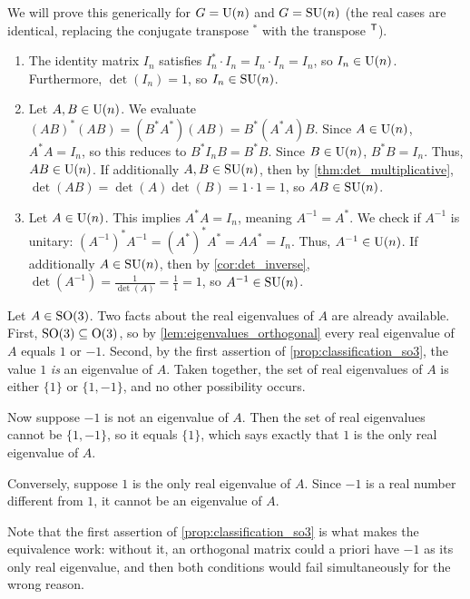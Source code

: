 \begin{exercisesolution}
\label{sol:group_properties}
We will prove this generically for $G = \operatorname{U}(n)$ and $G = \operatorname{SU}(n)$ (the real cases are identical, replacing the conjugate transpose $^*$ with the transpose $^{\mathsf{T}}$).
\begin{enumerate}[label=\textbf{(\alph*)}]
    \item The identity matrix $I_n$ satisfies $I_n^* \cdot I_n = I_n \cdot I_n = I_n$, so $I_n \in \operatorname{U}(n)$. Furthermore, $\det(I_n) = 1$, so $I_n \in \operatorname{SU}(n)$.
    
    \item Let $A, B \in \operatorname{U}(n)$. We evaluate $(AB)^* (AB) = (B^* A^*) (AB) = B^* (A^* A) B$. Since $A \in \operatorname{U}(n)$, $A^* A = I_n$, so this reduces to $B^* I_n B = B^* B$. Since $B \in \operatorname{U}(n)$, $B^* B = I_n$. Thus, $AB \in \operatorname{U}(n)$. 
    If additionally $A, B \in \operatorname{SU}(n)$, then by \cref{thm:det_multiplicative}, $\det(AB) = \det(A)\det(B) = 1 \cdot 1 = 1$, so $AB \in \operatorname{SU}(n)$.
    
    \item Let $A \in \operatorname{U}(n)$. This implies $A^* A = I_n$, meaning $A^{-1} = A^*$. We check if $A^{-1}$ is unitary: $(A^{-1})^* A^{-1} = (A^*)^* A^* = A A^* = I_n$. Thus, $A^{-1} \in \operatorname{U}(n)$. 
    If additionally $A \in \operatorname{SU}(n)$, then by \cref{cor:det_inverse}, $\det(A^{-1}) = \frac{1}{\det(A)} = \frac{1}{1} = 1$, so $A^{-1} \in \operatorname{SU}(n)$.
\end{enumerate}
\end{exercisesolution}

\begin{exercisesolution}
\label{sol:why_only_real_eigenvalue}
Let $A \in \operatorname{SO}(3)$. Two facts about the real eigenvalues of $A$ are already available. First, $\operatorname{SO}(3) \subseteq \operatorname{O}(3)$, so by \cref{lem:eigenvalues_orthogonal} every real eigenvalue of $A$ equals $1$ or $-1$. Second, by the first assertion of \cref{prop:classification_so3}, the value $1$ \emph{is} an eigenvalue of $A$. Taken together, the set of real eigenvalues of $A$ is either $\{1\}$ or $\{1, -1\}$, and no other possibility occurs.

Now suppose $-1$ is not an eigenvalue of $A$. Then the set of real eigenvalues cannot be $\{1, -1\}$, so it equals $\{1\}$, which says exactly that $1$ is the only real eigenvalue of $A$.

Conversely, suppose $1$ is the only real eigenvalue of $A$. Since $-1$ is a real number different from $1$, it cannot be an eigenvalue of $A$.

Note that the first assertion of \cref{prop:classification_so3} is what makes the equivalence work: without it, an orthogonal matrix could a priori have $-1$ as its only real eigenvalue, and then both conditions would fail simultaneously for the wrong reason.
\end{exercisesolution}

